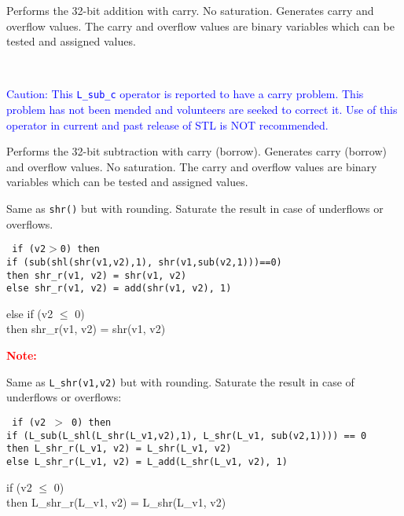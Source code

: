 Performs the 32-bit addition with carry. No saturation. Generates
carry and overflow values. The carry and overflow values are
binary variables which can be tested and assigned values.

\ \\

\textcolor{blue}{
%
  Caution: This {\tt L\_sub\_c} operator is reported to have a carry problem.
  This problem has not been mended and volunteers are seeked to correct it.
  Use of this operator in current and past release of STL is NOT recommended.
%
}

Performs the 32-bit subtraction with carry (borrow). Generates
carry (borrow) and overflow values. No saturation. The carry and
overflow values are binary variables which can be tested and
assigned values.


Same as {\tt shr()} but with rounding. Saturate the result in case
of underflows or overflows.

{\tt
{} if (v2$>$0) then\\
 if (sub(shl(shr(v1,v2),1), shr(v1,sub(v2,1)))==0) \\
 then shr\_r(v1, v2) = shr(v1, v2)\\
 else shr\_r(v1, v2) = add(shr(v1, v2), 1)

 else if (v2 $\leq$ 0) \\
 then shr\_r(v1, v2) = shr(v1, v2)}

\textcolor{red} {
\textbf{Note:} \hfill {}
}



Same as {\tt L\_shr(v1,v2)} but with rounding. Saturate the result in case of underflows or overflows:

{\tt
{} if (v2 $>$ 0) then\\
 if (L\_sub(L\_shl(L\_shr(L\_v1,v2),1), L\_shr(L\_v1, sub(v2,1)))) == 0 \\
 then L\_shr\_r(L\_v1, v2) = L\_shr(L\_v1, v2)\\
 else L\_shr\_r(L\_v1, v2) = L\_add(L\_shr(L\_v1, v2), 1)

 if (v2 $\leq$ 0) \\
 then L\_shr\_r(L\_v1, v2) = L\_shr(L\_v1, v2)}

